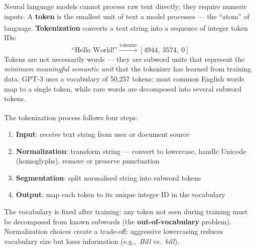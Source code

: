 \begin{tcbitemize}[ skin=sectionraster ]
    \tcbitem[title={Tokens: The Atoms of Language}, raster multicolumn=3]
    Neural language models cannot process raw text directly; they require numeric inputs.
    A \textbf{token} is the smallest unit of text a model processes --- the ``atom'' of language\textsuperscript{\cite[][p.~15]{farrisHowLargeLanguage2025}}.
    \textbf{Tokenization} converts a text string into a sequence of integer token IDs:
    \[
        \text{``Hello World!''} \xrightarrow{\text{tokenize}} [4944,\ 3574,\ 0]
    \]
    Tokens are not necessarily words --- they are subword units that represent the \emph{minimum meaningful semantic unit} that the tokenizer has learned from training data.
    GPT-3 uses a vocabulary of 50{,}257 tokens; most common English words map to a single token, while rare words are decomposed into several subword tokens.

    \tcbitem[title={The Tokenization Pipeline}, raster multicolumn=3]
    The tokenization process follows four steps\textsuperscript{\cite[][p.~17]{farrisHowLargeLanguage2025}}:
    \begin{enumerate}
        \item \textbf{Input}: receive text string from user or document source
        \item \textbf{Normalization}: transform string --- convert to lowercase, handle Unicode (homoglyphs), remove or preserve punctuation
        \item \textbf{Segmentation}: split normalised string into subword tokens
        \item \textbf{Output}: map each token to its unique integer ID in the vocabulary
    \end{enumerate}
    The vocabulary is fixed after training: any token not seen during training must be decomposed from known subwords (the \textbf{out-of-vocabulary} problem).
    Normalization choices create a trade-off: aggressive lowercasing reduces vocabulary size but loses information (e.g.,\ \emph{Bill} vs.\ \emph{bill}).


\end{tcbitemize}

